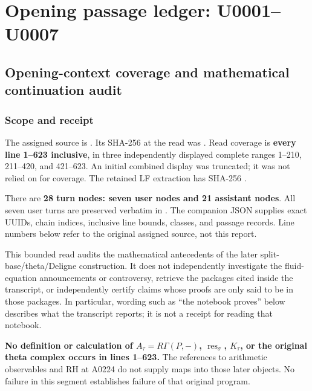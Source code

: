 \section{Opening passage ledger:
U0001--U0007}\label{TranscriptLedgerStage:opening-passage-ledger-u0001u0007}

\subsection{Opening-context coverage and mathematical continuation
audit}\label{TranscriptLedgerStage:opening-context-coverage-and-mathematical-continuation-audit}

\subsubsection{Scope and receipt}\label{TranscriptLedgerStage:scope-and-receipt}

The assigned source is
\protect{}.
Its SHA-256 at the read was
\protect{}.
Read coverage is \textbf{every line 1--623 inclusive}, in three
independently displayed complete ranges 1--210, 211--420, and 421--623.
An initial combined display was truncated; it was not relied on for
coverage. The retained LF extraction
\protect{} has SHA-256
\protect{}.

There are \textbf{28 turn nodes: seven user nodes and 21 assistant
nodes}. All seven user turns are preserved verbatim in
\protect{}. The companion JSON supplies
exact UUIDs, chain indices, inclusive line bounds, classes, and passage
records. Line numbers below refer to the original assigned source, not
this report.

This bounded read audits the mathematical antecedents of the later
split-base/theta/Deligne construction. It does not independently
investigate the fluid-equation announcements or controversy, retrieve
the packages cited inside the transcript, or independently certify
claims whose proofs are only said to be in those packages. In
particular, wording such as ``the notebook proves'' below describes what
the transcript reports; it is not a receipt for reading that notebook.

\textbf{No definition or calculation of \(A_\tau=R\Gamma(P,-)\),
\(\operatorname{res}_\sigma\), \(K_\tau\), or the original theta complex
occurs in lines 1--623.} The references to arithmetic observables and RH
at A0224 do not supply maps into those later objects. No failure in this
segment establishes failure of that original program.

